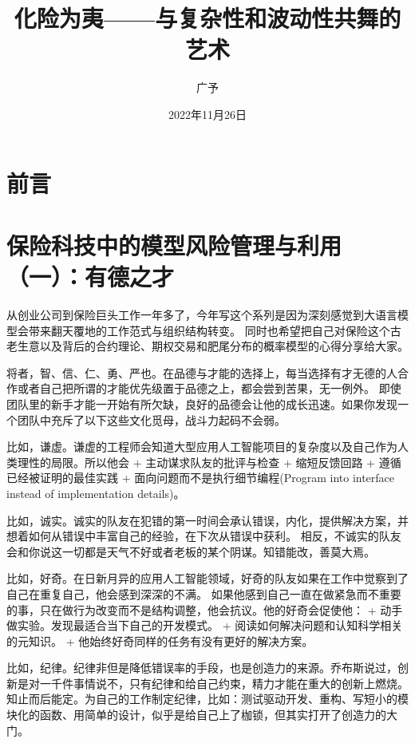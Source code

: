 \documentclass[
  oneside]{book}
\title{化险为夷------与复杂性和波动性共舞的艺术}
\author{广予}
\date{2022年11月26日}
\begin{document}
\maketitle

{
\setcounter{tocdepth}{1}
\tableofcontents
}
\hypertarget{ux524dux8a00}{%
\chapter*{前言}\label{ux524dux8a00}}

\hypertarget{ux4fddux9669ux79d1ux6280ux4e2dux7684ux6a21ux578bux98ceux9669ux7ba1ux7406ux4e0eux5229ux7528ux4e00ux6709ux5fb7ux4e4bux624d}{%
\chapter{保险科技中的模型风险管理与利用（一）：有德之才}\label{ux4fddux9669ux79d1ux6280ux4e2dux7684ux6a21ux578bux98ceux9669ux7ba1ux7406ux4e0eux5229ux7528ux4e00ux6709ux5fb7ux4e4bux624d}}

从创业公司到保险巨头工作一年多了，今年写这个系列是因为深刻感觉到大语言模型会带来翻天覆地的工作范式与组织结构转变。
同时也希望把自己对保险这个古老生意以及背后的合约理论、期权交易和肥尾分布的概率模型的心得分享给大家。

将者，智、信、仁、勇、严也。在品德与才能的选择上，每当选择有才无德的人合作或者自己把所谓的才能优先级置于品德之上，都会尝到苦果，无一例外。
即使团队里的新手才能一开始有所欠缺，良好的品德会让他的成长迅速。如果你发现一个团队中充斥了以下这些文化觅母，战斗力起码不会弱。

比如，谦虚。谦虚的工程师会知道大型应用人工智能项目的复杂度以及自己作为人类理性的局限。所以他会
+ 主动谋求队友的批评与检查
+ 缩短反馈回路
+ 遵循已经被证明的最佳实践
+ 面向问题而不是执行细节编程(Program into interface instead of implementation details)。

比如，诚实。诚实的队友在犯错的第一时间会承认错误，内化，提供解决方案，并想着如何从错误中丰富自己的经验，在下次从错误中获利。
相反，不诚实的队友会和你说这一切都是天气不好或者老板的某个阴谋。知错能改，善莫大焉。

比如，好奇。在日新月异的应用人工智能领域，好奇的队友如果在工作中觉察到了自己在重复自己，他会感到深深的不满。
如果他感到自己一直在做紧急而不重要的事，只在做行为改变而不是结构调整，他会抗议。他的好奇会促使他：
+ 动手做实验。发现最适合当下自己的开发模式。
+ 阅读如何解决问题和认知科学相关的元知识。
+ 他始终好奇同样的任务有没有更好的解决方案。

比如，纪律。纪律非但是降低错误率的手段，也是创造力的来源。乔布斯说过，创新是对一千件事情说不，只有纪律和给自己约束，精力才能在重大的创新上燃烧。知止而后能定。为自己的工作制定纪律，比如：测试驱动开发、重构、写短小的模块化的函数、用简单的设计，似乎是给自己上了枷锁，但其实打开了创造力的大门。
\end{document}
